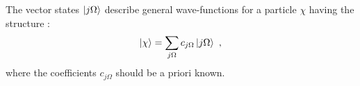 The vector states $\ket{j\Omega}$ describe general wave-functions for a particle $\chi$ having the structure \cite{hecht1962asymmetric}:
\begin{align}
    \ket{\chi}=\sum_{j\Omega}c_{j\Omega}\ket{j\Omega}\ ,
    \label{j-Omega-single-particle-states}
\end{align}
where the coefficients $c_{j\Omega}$ should be a priori known.
